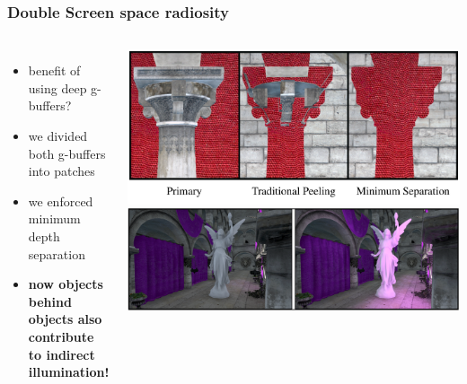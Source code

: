 \documentclass[aspectratio=169]{beamer}
\begin{document}
	\begin{frame}
		\frametitle{Double Screen space radiosity}
		\begin{columns}
				\begin{itemize}
					\item benefit of using deep g-buffers?
					\item we divided both g-buffers into patches
					\item we enforced minimum depth separation
					\item \textbf{now objects behind objects also contribute to indirect illumination!}
				\end{itemize}
				\includegraphics[height=.5\textwidth]{img/minimum_depth_separation.png}
				\includegraphics[width=1.05\textwidth]{img/radiosity_gi.png}
		\end{columns}
	\end{frame}
\end{document}

